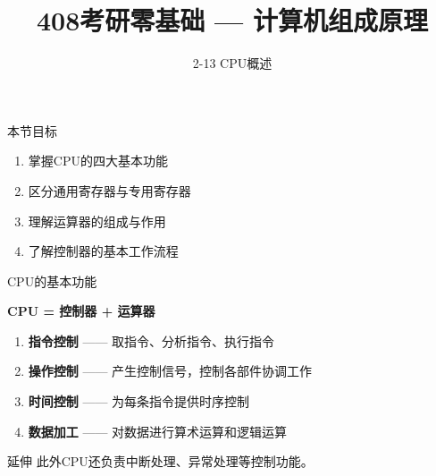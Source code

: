 \documentclass[10pt, aspectratio=169]{beamer}
\title{408考研零基础 --- 计算机组成原理}
\subtitle{2-13 CPU概述}
\author{}
\date{}
\begin{document}
\begin{frame}{本节目标}
    \begin{enumerate}
        \item 掌握CPU的四大基本功能
        \item 区分通用寄存器与专用寄存器
        \item 理解运算器的组成与作用
        \item 了解控制器的基本工作流程
    \end{enumerate}
\end{frame}

\begin{frame}{CPU的基本功能}
    \begin{center}
        \textbf{CPU = 控制器 + 运算器}
    \end{center}
    \vspace{0.5em}
    \begin{enumerate}
        \item \textbf{指令控制} —— 取指令、分析指令、执行指令
        \item \textbf{操作控制} —— 产生控制信号，控制各部件协调工作
        \item \textbf{时间控制} —— 为每条指令提供时序控制
        \item \textbf{数据加工} —— 对数据进行算术运算和逻辑运算
    \end{enumerate}
    \vspace{0.5em}
    \begin{block}{延伸}
        此外CPU还负责中断处理、异常处理等控制功能。
    \end{block}
\end{frame}
\end{document}
